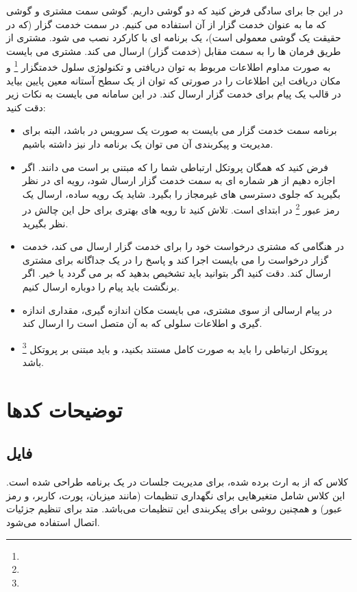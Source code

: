 \documentclass{report}
\begin{document}
در این جا برای سادگی فرض کنید که دو گوشی داریم. گوشی سمت مشتری و گوشی که ما به عنوان خدمت گزار از آن استفاده می کنیم. در سمت خدمت گزار (که در حقیقت یک گوشی معمولی است)، یک برنامه
 ای با کارکرد
  نصب می شود.
مشتری از طریق
  فرمان ها را به سمت مقابل (خدمت گزار) ارسال می کند. مشتری می بایست به صورت مداوم اطلاعات مربوط به توان دریافتی و تکنولوژی سلول خدمتگزار
  \footnote{}
  و مکان دریافت این اطلاعات را در صورتی که توان از یک سطح آستانه معین پایین بیاید در قالب یک پیام برای خدمت گزار ارسال کند. در این سامانه می بایست به نکات زیر دقت کنید:
  \begin{itemize}
  	\item
  	برنامه سمت خدمت گزار می بایست به صورت یک سرویس در 
  	باشد، البته برای مدیریت و پیکربندی آن می توان یک برنامه
  	 دار نیز داشته باشیم.
  	\item
  	فرض کنید که همگان پروتکل ارتباطی شما را که مبتنی بر
  	  است می دانند. اگر اجازه دهیم
  	    از هر شماره ای به سمت خدمت گزار ارسال شود، رویه ای در نظر بگیرید که جلوی دسترسی های غیرمجاز را بگیرد. شاید یک رویه ساده، ارسال یک رمز عبور
  	    \footnote{}
  	     در ابتدای
  	     است. تلاش کنید تا رویه های بهتری برای حل این چالش در نظر بگیرید.
  	\item
  	در هنگامی که مشتری درخواست خود را برای خدمت گزار ارسال می کند، خدمت گزار درخواست را می بایست اجرا کند و پاسخ را در یک
  	 جداگانه برای مشتری ارسال کند. دقت کنید اگر بتوانید باید تشخیص بدهید که 
  	 بر می گردد یا خیر. اگر برنگشت باید پیام را دوباره ارسال کنیم.
  	\item
  	در پیام ارسالی از سوی مشتری، می بایست مکان اندازه گیری، مقداری اندازه گیری و اطلاعات سلولی که به آن متصل است را ارسال کند.
  	\item 
  	پروتکل ارتباطی را باید به صورت کامل مستند بکنید، و باید مبتنی بر پروتکل 
  	\footnote{}
  	 باشد.
  \end{itemize}

\chapter{توضیحات کدها}
\section{فایل
}
کلاس 
 که از
   به ارث برده شده، برای مدیریت جلسات
     در یک برنامه
       طراحی شده است. این کلاس شامل متغیرهایی برای نگهداری تنظیمات
         (مانند میزبان، پورت، کاربر، و رمز عبور) و همچنین روشی برای پیکربندی این تنظیمات می‌باشد. متد
           برای تنظیم جزئیات اتصال
             استفاده می‌شود.
\end{document}
